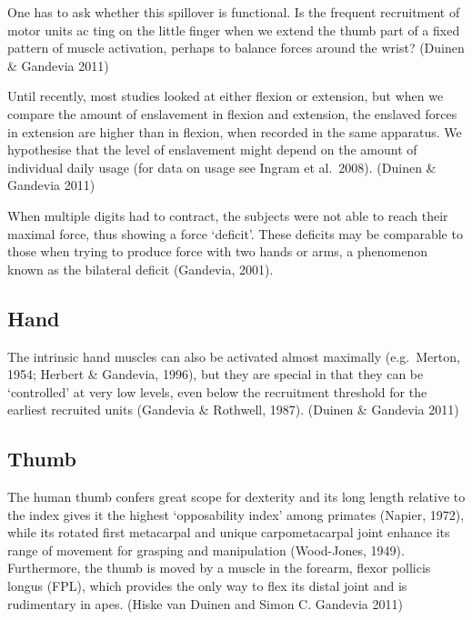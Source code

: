 {            One has to ask whether this spillover is functional. Is the
            frequent recruitment of motor units ac ting on the little
            finger when we extend the thumb part of a fixed pattern of
            muscle activation, perhaps to balance forces around the
            wrist? (Duinen \& Gandevia 2011)

            Until recently, most studies looked at either flexion or
            extension, but when we compare the amount of enslavement in
            flexion and extension, the enslaved forces in extension are
            higher than in flexion, when recorded in the same apparatus.
            We hypothesise that the level of enslavement might depend on
            the amount of individual daily usage (for data on usage see
            Ingram et al.~2008). (Duinen \& Gandevia 2011)

            When multiple digits had to contract, the subjects were not
            able to reach their maximal force, thus showing a force
            `deﬁcit'. These deﬁcits may be comparable to those when
            trying to produce force with two hands or arms, a phenomenon
            known as the bilateral deﬁcit (Gandevia, 2001).

            \hypertarget{hand}{%
            \subsection{Hand}\label{hand}}

            The intrinsic hand muscles can also be activated almost
            maximally (e.g.~Merton, 1954; Herbert \& Gandevia, 1996),
            but they are special in that they can be `controlled' at
            very low levels, even below the recruitment threshold for
            the earliest recruited units (Gandevia \& Rothwell, 1987).
            (Duinen \& Gandevia 2011)

            \hypertarget{thumb}{%
            \subsection{Thumb}\label{thumb}}

            The human thumb confers great scope for dexterity and its
            long length relative to the index gives it the highest
            `opposability index' among primates (Napier, 1972), while
            its rotated first metacarpal and unique carpometacarpal
            joint enhance its range of movement for grasping and
            manipulation (Wood-Jones, 1949). Furthermore, the thumb is
            moved by a muscle in the forearm, ﬂexor pollicis longus
            (FPL), which provides the only way to ﬂex its distal joint
            and is rudimentary in apes. (Hiske van Duinen and Simon C.
            Gandevia 2011)

}
